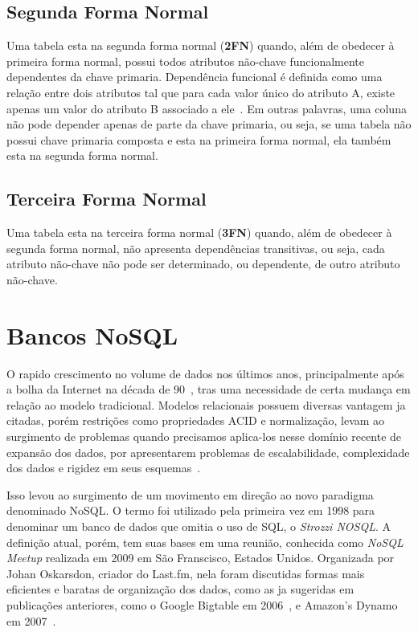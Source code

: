 \subsection*{Segunda Forma Normal}
	Uma tabela esta na segunda forma normal (\textbf{2FN}) quando, além de obedecer à primeira forma normal, possui todos atributos não-chave funcionalmente dependentes da chave primaria. Dependência funcional é definida como uma relação entre dois atributos tal que para cada valor único do atributo A, existe apenas um valor do atributo B associado a ele~\cite{jan}. Em outras palavras, uma coluna não pode depender apenas de parte da chave primaria, ou seja, se uma tabela não possui chave primaria composta e esta na primeira forma normal, ela também esta na segunda forma normal.
	
\subsection*{Terceira Forma Normal}
	Uma tabela esta na terceira forma normal (\textbf{3FN}) quando, além de obedecer à segunda forma normal, não apresenta dependências transitivas, ou seja, cada atributo não-chave não pode ser determinado, ou dependente, de outro atributo não-chave. 

\section{Bancos NoSQL}
    O rapido crescimento no volume de dados nos últimos anos, principalmente após a bolha da Internet na década de 90~\cite{pramod}, tras uma necessidade de certa mudança em relação ao modelo tradicional. Modelos relacionais possuem diversas vantagem ja citadas, porém restrições como propriedades ACID e normalização, levam ao surgimento de problemas quando precisamos aplica-los nesse domínio recente de expansão dos dados, por apresentarem problemas de escalabilidade, complexidade dos dados e rigidez em seus esquemas~\cite{leavitt2010nosql}. 
    
    Isso levou ao surgimento de um movimento em direção ao novo paradigma denominado NoSQL. O termo foi utilizado pela primeira vez em 1998 para denominar um banco de dados que omitia o uso de SQL, o \emph{Strozzi NOSQL}. A definição atual, porém, tem suas bases em uma reunião, conhecida como \emph{NoSQL Meetup} realizada em 2009 em São Franscisco, Estados Unidos. Organizada por Johan Oskarsdon, criador do Last.fm, nela foram discutidas formas mais eficientes e baratas de organização dos dados, como as ja sugeridas em publicações anteriores, como o Google Bigtable em 2006~\cite{bigtable}, e Amazon's Dynamo em 2007~\cite{dynamo, chrisnosql}.
